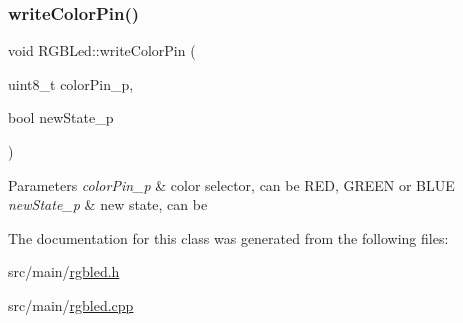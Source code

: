 \subsubsection{\texorpdfstring{write\+Color\+Pin()}{writeColorPin()}}
{\footnotesize\ttfamily void R\+G\+B\+Led\+::write\+Color\+Pin (\begin{DoxyParamCaption}\item[{uint8\+\_\+t}]{color\+Pin\+\_\+p,  }\item[{bool}]{new\+State\+\_\+p }\end{DoxyParamCaption})}


\begin{DoxyParams}{Parameters}
{\em color\+Pin\+\_\+p} & color selector, can be R\+ED, G\+R\+E\+EN or B\+L\+UE \\
\hline
{\em new\+State\+\_\+p} & new state, can be \\
\hline
\end{DoxyParams}


The documentation for this class was generated from the following files\+:\begin{DoxyCompactItemize}
\item 
src/main/\hyperlink{rgbled_8h}{rgbled.\+h}\item 
src/main/\hyperlink{rgbled_8cpp}{rgbled.\+cpp}\end{DoxyCompactItemize}
